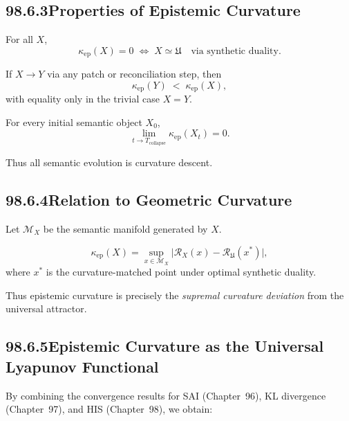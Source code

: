 \subsection*{98.6.3\quad Properties of Epistemic Curvature}

\begin{theorem}[Characterisation]
For all $X$,
\[
\kappa_{\mathrm{ep}}(X)=0
  \;\Longleftrightarrow\;
  X \simeq \mathfrak{U}
\quad\text{via synthetic duality}.
\]
\end{theorem}

\begin{theorem}
If $X\to Y$ via any patch or reconciliation step, then
\[
\kappa_{\mathrm{ep}}(Y)
  \;<\;
  \kappa_{\mathrm{ep}}(X),
\]
with equality only in the trivial case $X=Y$.
\end{theorem}

\begin{theorem}
For every initial semantic object $X_0$,
\[
\lim_{t\to T_{\mathrm{collapse}}}
  \kappa_{\mathrm{ep}}(X_t)
  = 0.
\]
\end{theorem}

Thus all semantic evolution is curvature descent.

\subsection*{98.6.4\quad Relation to Geometric Curvature}

Let $\mathcal{M}_X$ be the semantic manifold generated by $X$.

\begin{theorem}
\[
\kappa_{\mathrm{ep}}(X)
  =
  \sup_{x\in \mathcal{M}_X}
    \bigl|\mathcal{R}_X(x) - \mathcal{R}_{\mathfrak{U}}(x^\ast)\bigr|,
\]
where $x^\ast$ is the curvature-matched point under optimal synthetic duality.
\end{theorem}

Thus epistemic curvature is precisely the \emph{supremal curvature deviation}
from the universal attractor.

\subsection*{98.6.5\quad Epistemic Curvature as the Universal Lyapunov Functional}

By combining the convergence results for SAI (Chapter~96),
KL divergence (Chapter~97), and HIS (Chapter~98),
we obtain:

